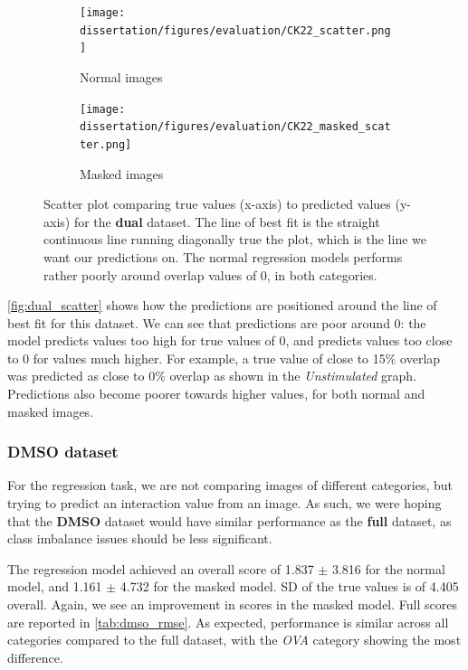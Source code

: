 \begin{figure}[bh!]
    \centering
    \begin{subfigure}{0.5\textwidth}
        \texttt{[image: dissertation/figures/evaluation/CK22\_scatter.png]}
        \caption{Normal images}
    \end{subfigure}
    \begin{subfigure}{0.5\textwidth}
        \texttt{[image: dissertation/figures/evaluation/CK22\_masked\_scatter.png]}
        \caption{Masked images}
    \end{subfigure}
    \caption{Scatter plot comparing true values (x-axis) to predicted values (y-axis) for the \textbf{dual} dataset. The line of best fit is the straight continuous line running diagonally true the plot, which is the line we want our predictions on. The normal regression models performs rather poorly around overlap values of 0, in both categories.}
    \label{fig:dual_scatter}
\end{figure}

\autoref{fig:dual_scatter} shows how the predictions are positioned around the line of best fit for this dataset. We can see that predictions are poor around 0: the model predicts values too high for true values of 0, and predicts values too close to 0 for values much higher. For example, a true value of close to 15\% overlap was predicted as close to 0\% overlap as shown in the \textit{Unstimulated} graph. Predictions also become poorer towards higher values, for both normal and masked images.

\bigskip
\subsubsection{DMSO dataset}
\hfill
\hfill 

For the regression task, we are not comparing images of different categories, but trying to predict an interaction value from an image. As such, we were hoping that the \textbf{DMSO} dataset would have similar performance as the \textbf{full} dataset, as class imbalance issues should be less significant. 

The regression model achieved an overall score of 1.837 $\pm$ 3.816 for the normal model, and 1.161 $\pm$ 4.732 for the masked model. SD of the true values is of 4.405 overall. Again, we see an improvement in scores in the masked model. Full scores are reported in \autoref{tab:dmso_rmse}. As expected, performance is similar across all categories compared to the full dataset, with the \textit{OVA} category showing the most difference. 

